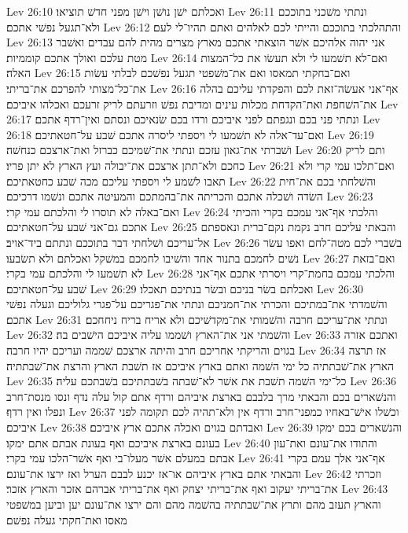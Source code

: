 Lev 26:10  ואכלתם ישׁן נושׁן וישׁן מפני חדשׁ תוציאו׃
Lev 26:11  ונתתי משׁכני בתוככם ולא־תגעל נפשׁי אתכם׃
Lev 26:12  והתהלכתי בתוככם והייתי לכם לאלהים ואתם תהיו־לי לעם׃
Lev 26:13  אני יהוה אלהיכם אשׁר הוצאתי אתכם מארץ מצרים מהית להם עבדים ואשׁבר מטת עלכם ואולך אתכם קוממיות׃
Lev 26:14  ואם־לא תשׁמעו לי ולא תעשׂו את כל־המצות האלה׃
Lev 26:15  ואם־בחקתי תמאסו ואם את־משׁפטי תגעל נפשׁכם לבלתי עשׂות את־כל־מצותי להפרכם את־בריתי׃
Lev 26:16  אף־אני אעשׂה־זאת לכם והפקדתי עליכם בהלה את־השׁחפת ואת־הקדחת מכלות עינים ומדיבת נפשׁ וזרעתם לריק זרעכם ואכלהו איביכם׃
Lev 26:17  ונתתי פני בכם ונגפתם לפני איביכם ורדו בכם שׂנאיכם ונסתם ואין־רדף אתכם׃
Lev 26:18  ואם־עד־אלה לא תשׁמעו לי ויספתי ליסרה אתכם שׁבע על־חטאתיכם׃
Lev 26:19  ושׁברתי את־גאון עזכם ונתתי את־שׁמיכם כברזל ואת־ארצכם כנחשׁה׃
Lev 26:20  ותם לריק כחכם ולא־תתן ארצכם את־יבולה ועץ הארץ לא יתן פריו׃
Lev 26:21  ואם־תלכו עמי קרי ולא תאבו לשׁמע לי ויספתי עליכם מכה שׁבע כחטאתיכם׃
Lev 26:22  והשׁלחתי בכם את־חית השׂדה ושׁכלה אתכם והכריתה את־בהמתכם והמעיטה אתכם ונשׁמו דרכיכם׃
Lev 26:23  ואם־באלה לא תוסרו לי והלכתם עמי קרי׃
Lev 26:24  והלכתי אף־אני עמכם בקרי והכיתי אתכם גם־אני שׁבע על־חטאתיכם׃
Lev 26:25  והבאתי עליכם חרב נקמת נקם־ברית ונאספתם אל־עריכם ושׁלחתי דבר בתוככם ונתתם ביד־אויב׃
Lev 26:26  בשׁברי לכם מטה־לחם ואפו עשׂר נשׁים לחמכם בתנור אחד והשׁיבו לחמכם במשׁקל ואכלתם ולא תשׂבעו׃
Lev 26:27  ואם־בזאת לא תשׁמעו לי והלכתם עמי בקרי׃
Lev 26:28  והלכתי עמכם בחמת־קרי ויסרתי אתכם אף־אני שׁבע על־חטאתיכם׃
Lev 26:29  ואכלתם בשׂר בניכם ובשׂר בנתיכם תאכלו׃
Lev 26:30  והשׁמדתי את־במתיכם והכרתי את־חמניכם ונתתי את־פגריכם על־פגרי גלוליכם וגעלה נפשׁי אתכם׃
Lev 26:31  ונתתי את־עריכם חרבה והשׁמותי את־מקדשׁיכם ולא אריח בריח ניחחכם׃
Lev 26:32  והשׁמתי אני את־הארץ ושׁממו עליה איביכם הישׁבים בה׃
Lev 26:33  ואתכם אזרה בגוים והריקתי אחריכם חרב והיתה ארצכם שׁממה ועריכם יהיו חרבה׃
Lev 26:34  אז תרצה הארץ את־שׁבתתיה כל ימי השׁמה ואתם בארץ איביכם אז תשׁבת הארץ והרצת את־שׁבתתיה׃
Lev 26:35  כל־ימי השׁמה תשׁבת את אשׁר לא־שׁבתה בשׁבתתיכם בשׁבתכם עליה׃
Lev 26:36  והנשׁארים בכם והבאתי מרך בלבבם בארצת איביהם ורדף אתם קול עלה נדף ונסו מנסת־חרב ונפלו ואין רדף׃
Lev 26:37  וכשׁלו אישׁ־באחיו כמפני־חרב ורדף אין ולא־תהיה לכם תקומה לפני איביכם׃
Lev 26:38  ואבדתם בגוים ואכלה אתכם ארץ איביכם׃
Lev 26:39  והנשׁארים בכם ימקו בעונם בארצת איביכם ואף בעונת אבתם אתם ימקו׃
Lev 26:40  והתודו את־עונם ואת־עון אבתם במעלם אשׁר מעלו־בי ואף אשׁר־הלכו עמי בקרי׃
Lev 26:41  אף־אני אלך עמם בקרי והבאתי אתם בארץ איביהם או־אז יכנע לבבם הערל ואז ירצו את־עונם׃
Lev 26:42  וזכרתי את־בריתי יעקוב ואף את־בריתי יצחק ואף את־בריתי אברהם אזכר והארץ אזכר׃
Lev 26:43  והארץ תעזב מהם ותרץ את־שׁבתתיה בהשׁמה מהם והם ירצו את־עונם יען וביען במשׁפטי מאסו ואת־חקתי געלה נפשׁם׃
